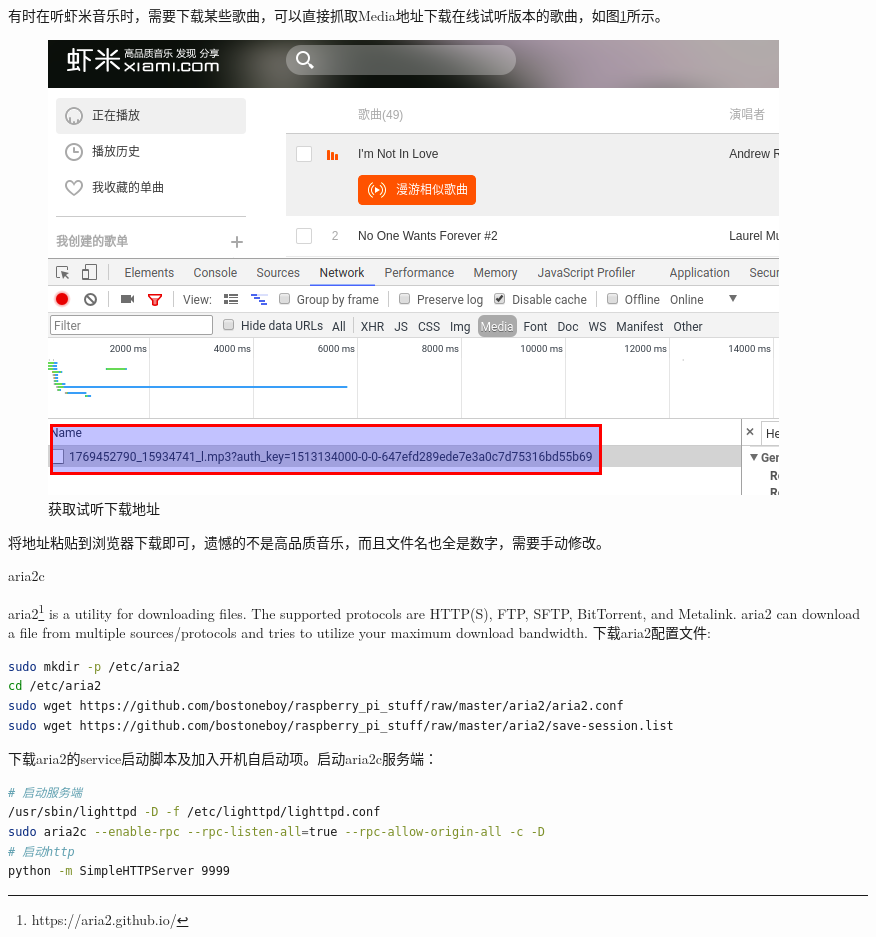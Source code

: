 \documentclass[12pt]{book}
\makeatletter
\numberwithin{dummy}{section}
\theoremstyle{ocrenumbox}
\theoremstyle{blacknumex}
\theoremstyle{blacknumbox}
\theoremstyle{ocrenum}
\renewcommand{\subsection}{\@startsection {subsection}{2}{\z@}
	{-3ex \@plus -0.1ex \@minus -.4ex}
	{0.5ex \@plus.2ex }
	{\normalfont\sffamily\bfseries}}
\makeatother
\begin{document}
有时在听虾米音乐时，需要下载某些歌曲，可以直接抓取Media地址下载在线试听版本的歌曲，如图\ref{fig:scratchxiamidownloadurl}所示。

\begin{figure}[htbp]
	\centering
	\includegraphics[scale=0.5]{scratchxiamidownloadurl.png}
	\caption{获取试听下载地址}
	\label{fig:scratchxiamidownloadurl}
\end{figure}

将地址粘贴到浏览器下载即可，遗憾的不是高品质音乐，而且文件名也全是数字，需要手动修改。

\subsection{aria2c}

aria2\footnote{https://aria2.github.io/} is a utility for downloading files. The supported protocols are HTTP(S), FTP, SFTP, BitTorrent, and Metalink. aria2 can download a file from multiple sources/protocols and tries to utilize your maximum download bandwidth. 下载aria2配置文件:

\begin{lstlisting}[language=Bash]
sudo mkdir -p /etc/aria2
cd /etc/aria2
sudo wget https://github.com/bostoneboy/raspberry_pi_stuff/raw/master/aria2/aria2.conf
sudo wget https://github.com/bostoneboy/raspberry_pi_stuff/raw/master/aria2/save-session.list
\end{lstlisting}

下载aria2的service启动脚本及加入开机自启动项。启动aria2c服务端：

\begin{lstlisting}[language=Bash]
# 启动服务端
/usr/sbin/lighttpd -D -f /etc/lighttpd/lighttpd.conf
sudo aria2c --enable-rpc --rpc-listen-all=true --rpc-allow-origin-all -c -D
# 启动http
python -m SimpleHTTPServer 9999
\end{lstlisting}
\end{document}
